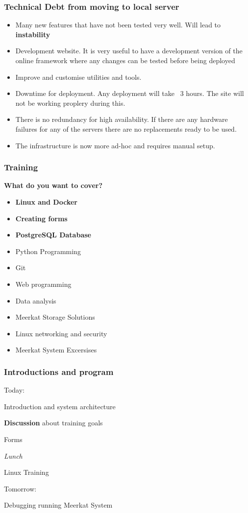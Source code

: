 \documentclass{beamer}
\begin{document}
\begin{frame}
  \frametitle{Technical Debt from moving to local server}
  \begin{itemize}
    \item Many new features that have not been tested very well. Will lead to {\bf instability}
    \item Development website. It is very useful to have a development version of the online framework where any changes can be tested before being deployed
    \item Improve and customise utilities and tools. 
    \item Downtime for deployment. Any deployment will take  ~3 hours. The site will not be working proplery during this. 
    \item There is no redundancy for high availability. If there are any hardware failures for any of the servers there are no replacements ready to be used. 
    \item The infrastructure is now more ad-hoc and requires manual setup.
  \end{itemize}
\end{frame}

\begin{frame}
  \frametitle{Training}

  {\bf What do you want to cover?}

  \begin{itemize}
  \item {\bf Linux and Docker}
  \item {\bf Creating forms}
  \item {\bf PostgreSQL Database}
  \item Python Programming
  \item Git
  \item Web programming
  \item Data analysis
  \item Meerkat Storage Solutions
  \item Linux networking and security
    \item Meerkat System Excersises

  \end{itemize}
\end{frame}
\begin{frame}
  \frametitle{Introductions and program}


  {\large Today:}
  \vspace{5pt}
  
  Introduction and system architecture
  
  {\bf Discussion} about training goals
  
  Forms
  
  {\it Lunch}
  
  Linux Training
  
  \vspace{30pt}  
  {\large Tomorrow:}
         
  \vspace{5pt}  
  Debugging running Meerkat System
  
\end{frame}  
  
\end{document}
